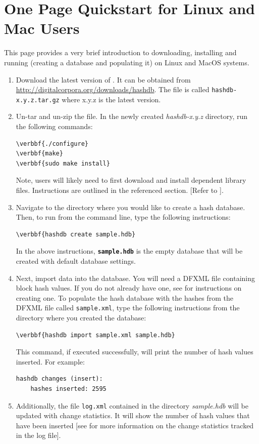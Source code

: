 \documentclass[11pt,fleqn]{article} %
\begin{document}
\newpage
\section*{One Page Quickstart for Linux and Mac Users}
This page provides a very brief introduction to downloading, installing and running \hash (creating a database and populating it) on Linux and MacOS systems. 
\begin{enumerate}
\item Download the latest version of \hash. It can be obtained from \url{http://digitalcorpora.org/downloads/hashdb}. The file is called \texttt{hashdb-x.y.z.tar.gz} where x.y.z is the latest version. 

\item Un-tar and un-zip the file.  In the newly created \textit{hashdb-x.y.z} directory, run the following commands:

\begin{Verbatim}[commandchars=\\\{\}]
\verbbf{./configure}
\verbbf{make}
\verbbf{sudo make install}
\end{Verbatim}
Note, users will likely need to first download and install dependent library files. Instructions are outlined in the referenced section.  [Refer to \textbf{}].

\item Navigate to the directory where you would like to create a hash database. Then, to run \hash from the command line, type the following instructions: 
\begin{Verbatim}[commandchars=\\\{\}]
\verbbf{hashdb create sample.hdb}
\end{Verbatim} 

In the above instructions, \texttt{\textbf{sample.hdb}} is the empty database that will be created with default database settings. 

\item Next, import data into the database. You will need a DFXML file containing block hash values. If you do not already have one, see \textbf{} for instructions on creating one. To populate the hash database with the hashes from the DFXML file called \texttt{sample.xml}, type the following instructions from the directory where you created the database:
\begin{Verbatim}[commandchars=\\\{\}]
\verbbf{hashdb import sample.xml sample.hdb}
\end{Verbatim} 
This command, if executed successfully, will print the number of hash values inserted. For example: 
\begingroup
\footnotesize
\begin{Verbatim}[fontfamily=courier]
hashdb changes (insert):
    hashes inserted: 2595
\end{Verbatim}
\endgroup
\item Additionally, the file \texttt{log.xml} contained in the directory \textit{sample.hdb} will be updated with change statistics. It will show the number of hash values that have been inserted [see \textbf{ }for more information on the change statistics tracked in the log file].
\end{enumerate}
\end{document}
